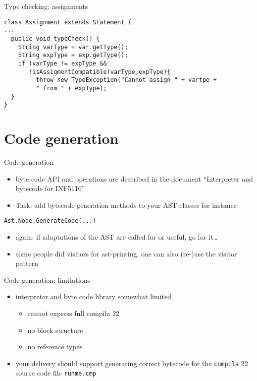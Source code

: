 \documentclass{beamer}
\begin{document}
\begin{frame}[label={sec:orgd6f2d3b},fragile,plain]{Type checking: assignments}
 \lstset{language=java,label= ,caption= ,captionpos=b,numbers=none}
\begin{lstlisting}
class Assignment extends Statement {
...
  public void typeCheck() {
    String varType = var.getType();
    String expType = exp.getType();
    if (varType != expType &&
       !isAssigmentCompatible(varType,expType){
		 throw new TypeException("Cannot assign " + vartpe + 
		 " from " + expType);
  }
}

\end{lstlisting}
\end{frame}



\chapter{Code generation}
\label{sec:orgced0969}
\begin{frame}[label={sec:org9eec11f},fragile]{Code generation}
 \begin{itemize}
\item byte code API and operations are described in the document ``Interpreter
and bytecode for INF5110''

\item \alert{Task:} add bytecode generation methods to your AST classes
for instance
\end{itemize}

\begin{verbatim}
Ast.Node.GenerateCode(...)
\end{verbatim}
\begin{itemize}
\item again: if adaptations of the AST are called for or useful, go for it\ldots{}

\item some people did \alert{visitors} for ast-printing, one can also (re-)use the visitor pattern
\end{itemize}
\end{frame}

\begin{frame}[label={sec:orgf0194ee},fragile]{Code generation: limitations}
 \begin{itemize}
\item interpreter and byte code library somewhat \alert{limited}
\begin{itemize}
\item cannot express full compila 22
\item no block structure
\item no reference types
\end{itemize}
\end{itemize}


\begin{itemize}
\item your delivery should support generating correct bytecode
for the \texttt{compila} 22 source code file \texttt{runme.cmp}
\end{itemize}
\end{frame}
\end{document}
